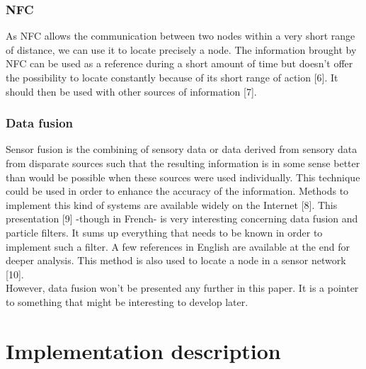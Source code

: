 \documentclass[a4paper,10pt]{article}
\begin{document}
\subsubsection{NFC}
As NFC allows the communication between two nodes within a very short range of distance, we can use it to locate precisely a node. The information 
brought by NFC can be used as a reference during a short amount of time but doesn't offer the possibility to locate constantly because of its short 
range of action [6]. It should then be used with other sources of information [7].

\subsubsection{Data fusion}
Sensor fusion is the combining of sensory data or data derived from sensory data from disparate sources such that the resulting information is in 
some sense better than would be possible when these sources were used individually. This technique could be used in order to enhance the accuracy of 
the information. Methods to implement this kind of systems are available widely on the Internet [8]. This presentation [9] -though in French- is very 
interesting concerning data fusion and particle filters. It sums up everything that needs to be known in order to implement such a filter. A few 
references in English are available at the end for deeper analysis. This method is also used to locate a node in a sensor network [10].\\
However, data fusion won't be presented any further in this paper. It is a pointer to something that might be interesting to develop later.

\section{Implementation description}
\end{document}
